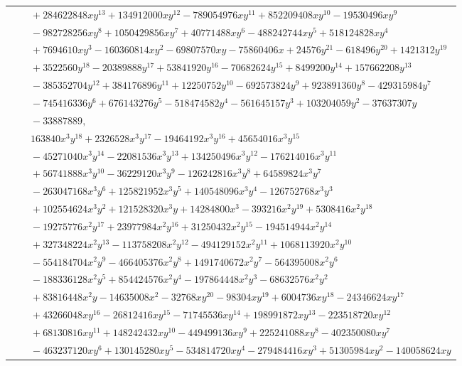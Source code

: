 \documentclass[11pt]{article}
\begin{document}
\begin{longtable}{@{}ll@{}}
 & $\quad +284622848xy^{13}+134912000xy^{12}-789054976xy^{11}+852209408xy^{10}-19530496xy^{9}$\\
 & $\quad -982728256xy^{8}+1050429856xy^{7}+40771488xy^{6}-488242744xy^{5}+518124828xy^{4}$\\
 & $\quad +7694610xy^{3}-160360814xy^{2}-69807570xy-75860406x+24576y^{21}-618496y^{20}+1421312y^{19}$\\
 & $\quad +3522560y^{18}-20389888y^{17}+53841920y^{16}-70682624y^{15}+8499200y^{14}+157662208y^{13}$\\
 & $\quad -385352704y^{12}+384176896y^{11}+12250752y^{10}-692573824y^{9}+923891360y^{8}-429315984y^{7}$\\
 & $\quad -745416336y^{6}+676143276y^{5}-518474582y^{4}-561645157y^{3}+103204059y^{2}-37637307y$\\
 & $\quad -33887889,$\\
 & $\quad 163840x^{3}y^{18}+2326528x^{3}y^{17}-19464192x^{3}y^{16}+45654016x^{3}y^{15}$\\
 & $\quad -45271040x^{3}y^{14}-22081536x^{3}y^{13}+134250496x^{3}y^{12}-176214016x^{3}y^{11}$\\
 & $\quad +56741888x^{3}y^{10}-36229120x^{3}y^{9}-126242816x^{3}y^{8}+64589824x^{3}y^{7}$\\
 & $\quad -263047168x^{3}y^{6}+125821952x^{3}y^{5}+140548096x^{3}y^{4}-126752768x^{3}y^{3}$\\
 & $\quad +102554624x^{3}y^{2}+121528320x^{3}y+14284800x^{3}-393216x^{2}y^{19}+5308416x^{2}y^{18}$\\
 & $\quad -19275776x^{2}y^{17}+23977984x^{2}y^{16}+31250432x^{2}y^{15}-194514944x^{2}y^{14}$\\
 & $\quad +327348224x^{2}y^{13}-113758208x^{2}y^{12}-494129152x^{2}y^{11}+1068113920x^{2}y^{10}$\\
 & $\quad -554184704x^{2}y^{9}-466405376x^{2}y^{8}+1491740672x^{2}y^{7}-564395008x^{2}y^{6}$\\
 & $\quad -188336128x^{2}y^{5}+854424576x^{2}y^{4}-197864448x^{2}y^{3}-68632576x^{2}y^{2}$\\
 & $\quad +83816448x^{2}y-14635008x^{2}-32768xy^{20}-98304xy^{19}+6004736xy^{18}-24346624xy^{17}$\\
 & $\quad +43266048xy^{16}-26812416xy^{15}-71745536xy^{14}+198991872xy^{13}-223518720xy^{12}$\\
 & $\quad +68130816xy^{11}+148242432xy^{10}-449499136xy^{9}+225241088xy^{8}-402350080xy^{7}$\\
 & $\quad -463237120xy^{6}+130145280xy^{5}-534814720xy^{4}-279484416xy^{3}+51305984xy^{2}-140058624xy$\\

\end{longtable}
\end{document}

